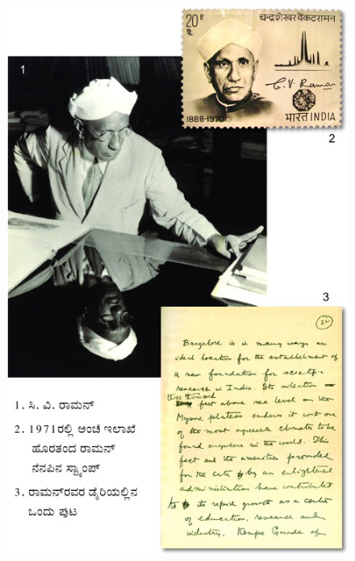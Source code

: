 \begin{figure}[!htpb]
\centering
\includegraphics[scale=2.15]{"images/002.jpg"}
\end{figure}

\vfill

\misccmd

